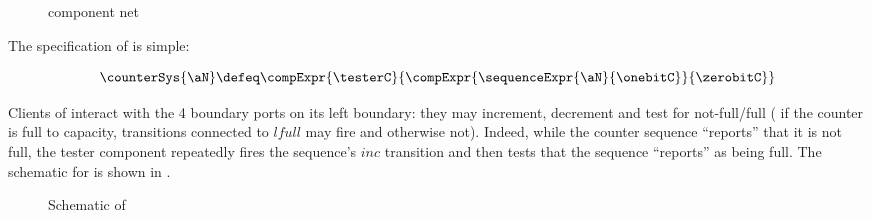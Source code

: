 \begin{figure}[ht]
    \centering
    \caption{\testerC{} component net}
    \label{fig:testerC}
\end{figure}

The specification of \counterSys{\aN} is simple:

\[
    \counterSys{\aN} \defeq
        \compExpr{\testerC}{\compExpr{\sequenceExpr{\aN}{\onebitC}}{\zerobitC}}
\]

Clients of \counterSys{\aN} interact with the 4 boundary ports on its left
boundary: they may increment, decrement and test for not-full/full ( if the
counter is full to capacity, transitions connected to $\mathit{lfull}$ may fire
and otherwise not). Indeed, while the counter sequence ``reports'' that it is
not full, the tester component repeatedly fires the sequence's $\mathit{inc}$
transition and then tests that the sequence ``reports'' as being full. The
schematic for  is shown in .

\begin{figure}[ht]%
\centering
{}
\caption{Schematic of }
\label{fig:counterschematic}
\end{figure}
